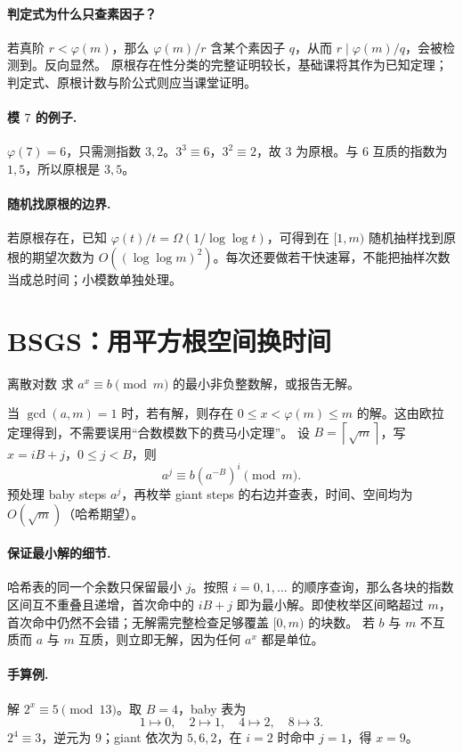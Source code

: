 \documentclass[UTF8,a4paper,11pt,oneside,openany,fontset=fandol]{ctexbook}
\theoremstyle{definition}
\newcommand{\ceil}[1]{\left\lceil #1\right\rceil}
\begin{document}
\paragraph{判定式为什么只查素因子？}
若真阶 $r<\varphi(m)$，那么 $\varphi(m)/r$ 含某个素因子 $q$，从而 $r\mid\varphi(m)/q$，会被检测到。反向显然。
原根存在性分类的完整证明较长，基础课将其作为已知定理；判定式、原根计数与阶公式则应当课堂证明。
\paragraph{模 $7$ 的例子.} $\varphi(7)=6$，只需测指数 $3,2$。$3^3\equiv6$，$3^2\equiv2$，故 $3$ 为原根。与 $6$ 互质的指数为 $1,5$，所以原根是 $3,5$。
\paragraph{随机找原根的边界.} 若原根存在，已知 $\varphi(t)/t=\Omega(1/\log\log t)$，可得到在 $[1,m)$ 随机抽样找到原根的期望次数为 $O((\log\log m)^2)$。每次还要做若干快速幂，不能把抽样次数当成总时间；小模数单独处理。


\section{BSGS：用平方根空间换时间}
\begin{problem}{离散对数}
求 $a^x\equiv b\pmod m$ 的最小非负整数解，或报告无解。
\end{problem}
当 $\gcd(a,m)=1$ 时，若有解，则存在 $0\le x<\varphi(m)\le m$ 的解。这由欧拉定理得到，不需要误用“合数模数下的费马小定理”。
设 $B=\ceil{\sqrt m}$，写 $x=iB+j$，$0\le j<B$，则
\[
 a^j\equiv b(a^{-B})^i\pmod m.
\]
预处理 baby steps $a^j$，再枚举 giant steps 的右边并查表，时间、空间均为 $O(\sqrt m)$（哈希期望）。


\paragraph{保证最小解的细节.}
哈希表的同一个余数只保留最小 $j$。按照 $i=0,1,\ldots$ 的顺序查询，那么各块的指数区间互不重叠且递增，首次命中的 $iB+j$ 即为最小解。即使枚举区间略超过 $m$，首次命中仍然不会错；无解需完整检查足够覆盖 $[0,m)$ 的块数。
若 $b$ 与 $m$ 不互质而 $a$ 与 $m$ 互质，则立即无解，因为任何 $a^x$ 都是单位。

\paragraph{手算例.} 解 $2^x\equiv5\pmod{13}$。取 $B=4$，baby 表为
\[
1\mapsto0,\quad2\mapsto1,\quad4\mapsto2,\quad8\mapsto3.
\]
$2^4\equiv3$，逆元为 $9$；giant 依次为 $5,6,2$，在 $i=2$ 时命中 $j=1$，得 $x=9$。
\end{document}
